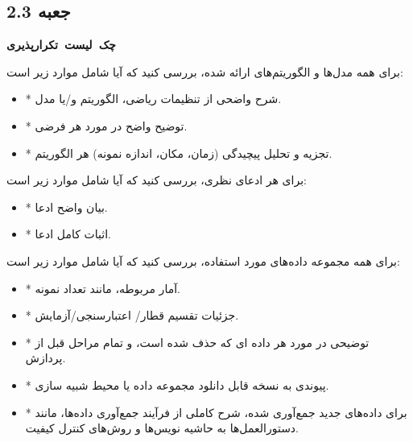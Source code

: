 \newpage

\begin{tcolorbox}[colback=gray!10,colframe=black,breakable]

    \section*{جعبه 2.3}
    \label{sec:جعبه 2.3}
    \begin{Large}
        \textbf{\mbox{چک لیست تکرارپذیری}}
    \end{Large}
    \newline
    برای همه مدل‌ها و الگوریتم‌های ارائه شده، بررسی کنید که آیا شامل موارد زیر است:

    \begin{itemize}[itemsep=0.2ex]
        \item * شرح واضحی از تنظیمات ریاضی، الگوریتم و/یا مدل.
        \item * توضیح واضح در مورد هر فرضی.
        \item * تجزیه و تحلیل پیچیدگی (زمان، مکان، اندازه نمونه) هر الگوریتم.
        \newline
    \end{itemize}

    برای هر ادعای نظری، بررسی کنید که آیا شامل موارد زیر است:
    \begin{itemize}[itemsep=0.2ex]
        \item * بیان واضح ادعا.
        \item * اثبات کامل ادعا.
        \newline
    \end{itemize}

    برای همه مجموعه داده‌های مورد استفاده، بررسی کنید که آیا شامل موارد زیر است:
    \begin{itemize}[itemsep=0.2ex]
        \item * آمار مربوطه، مانند تعداد نمونه.
        \item * جزئیات تقسیم قطار/ اعتبارسنجی/آزمایش.
        \item * توضیحی در مورد هر داده ای که حذف شده است، و تمام مراحل قبل از پردازش.
        \item * پیوندی به نسخه قابل دانلود مجموعه داده یا محیط شبیه سازی.
        \item * برای داده‌های جدید جمع‌آوری شده، شرح کاملی از فرآیند جمع‌آوری داده‌ها، مانند دستورالعمل‌ها به حاشیه نویس‌ها و روش‌های کنترل کیفیت.
        \newline
    \end{itemize}


\end{tcolorbox}

